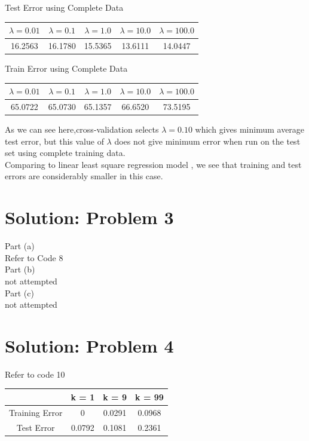 \documentclass[twoside,10pt,a4paper]{article}
\theoremstyle{definition}
\theoremstyle{definition}
\theoremstyle{remark}
\renewcommand{\>}{{\rightarrow}}
\newcommand{\1}{{\mathbf 1}}
\newcommand{\0}{{\mathbf 0}}
\begin{document}
Test Error using Complete Data
\begin{center}
\begin{tabular}{| c| c | c | c | c|}
\hline
   $\lambda = 0.01$ & $\lambda = 0.1$ & $\lambda = 1.0 $ & $\lambda = 10.0$& $\lambda = 100.0$\\
\hline
 16.2563 &  16.1780 &  15.5365 &  13.6111 &  14.0447 \\

\hline
\end{tabular}
\end{center}
Train Error using Complete Data
\begin{center}
\begin{tabular}{| c| c | c | c | c|}
\hline
   $\lambda = 0.01$ & $\lambda = 0.1$ & $\lambda = 1.0 $ & $\lambda = 10.0$& $\lambda = 100.0$\\
\hline
 65.0722 & 65.0730 &  65.1357 &  66.6520 & 73.5195 \\

\hline
\end{tabular}
\end{center}

As we can see here,cross-validation selects $\lambda = 0.10$ which gives minimum average test error, but this value of $\lambda$
does not give minimum error when run on the test set using complete training data. \\

Comparing to linear least square regression model , we see that training and test errors are considerably smaller in this case.

\section{Solution: Problem 3}
Part (a) \\
Refer to Code 8\\

Part (b) \\
not attempted \\

Part (c) \\
not attempted \\

\section{Solution: Problem 4}
Refer to code 10\\
\begin{center}
\begin{tabular}{| c| c | c| c |}
\hline
  &   k = 1  & k = 9 &  k = 99 \\
\hline
Training Error & 0 & 0.0291 & 0.0968  \\
\hline
Test Error & 0.0792 & 0.1081 & 0.2361 \\

\hline
\end{tabular}
\end{center}
\end{document}
